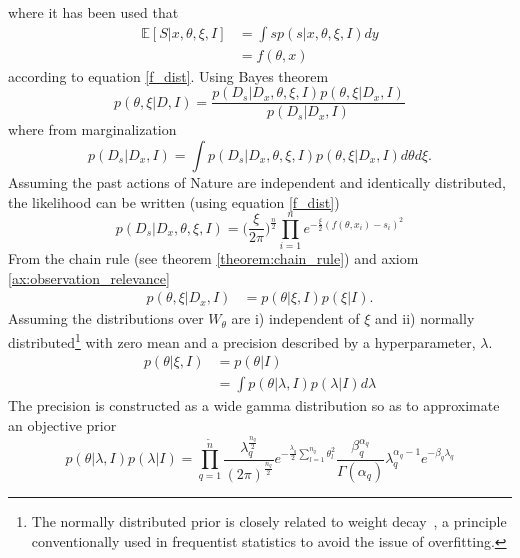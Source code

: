 where it has been used that
\begin{equation}
	\begin{split}
		\mathbb{E}[S|x,\theta,\xi,I] &= \int s p(s|x,\theta,\xi,I) dy\\
		&= f(\theta,x)
	\end{split}
\end{equation}
according to equation \eqref{f_dist}. Using Bayes theorem
\begin{equation}
	p(\theta,\xi|D,I) = \frac{p(D_s|D_x,\theta,\xi,I)p(\theta,\xi|D_x,I)}{p(D_s|D_x,I)}
	\label{eq:bayes2}
\end{equation}
where from marginalization
\begin{equation}
	p(D_s|D_x,I) = \int p(D_s|D_x,\theta,\xi,I)p(\theta,\xi|D_x,I) d\theta d\xi.
\end{equation}
Assuming the past actions of Nature are independent and identically distributed, the likelihood can be written (using equation \eqref{f_dist})
\begin{equation}
	p(D_s|D_x,\theta,\xi,I) = \bigg(\frac{\xi}{2\pi}\bigg)^\frac{n}{2}\prod_{i=1}^n e^{-\frac{\xi}{2}(f(\theta,x_i)-s_i)^2}
	\label{reg:likelihood}
\end{equation}
From the chain rule (see theorem \ref{theorem:chain_rule}) and axiom \ref{ax:observation_relevance}
\begin{equation}
	\begin{split}
		p(\theta,\xi|D_x,I) &= p(\theta|\xi,I)p(\xi|I).
	\end{split}
\end{equation}
Assuming the distributions over $W_\theta$ are i) independent of $\xi$ and ii) normally distributed\footnote{The normally distributed prior is closely related to weight decay~\citep{Plaut1986}, a principle conventionally used in frequentist statistics to avoid the issue of overfitting.} with zero mean and a precision described by a hyperparameter, $\lambda$. 	 
\begin{equation}
	\begin{split}
		p(\theta|\xi,I) & = p(\theta|I)\\
		& = \int p(\theta|\lambda,I)p(\lambda|I)d\lambda
	\end{split}
	\label{eq:prior1}
\end{equation}
The precision is constructed as a wide gamma distribution so as to approximate an objective prior
\begin{equation}
	p(\theta|\lambda,I)p(\lambda|I)
	= \prod_{q=1}^{\tilde{n}} \frac{\lambda_q^\frac{n_q}{2}}{(2\pi)^\frac{n_q}{2}}e^{-\frac{\lambda_q}{2}\sum_{l=1}^{n_q}\theta_l^2}\frac{\beta_q^{\alpha_q}}{\Gamma(\alpha_q)}\lambda_q^{\alpha_q-1}e^{-\beta_q \lambda_q}
	\label{eq:prior}
\end{equation}

